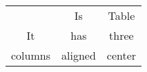 \documentclass{article}
\begin{document}
\begin{table}
\begin{tabular}{ccc}{
This&Is&Table\\
It&has&three\\
columns&aligned&center
}
\end{tabular}
\end{table}
\end{document}
